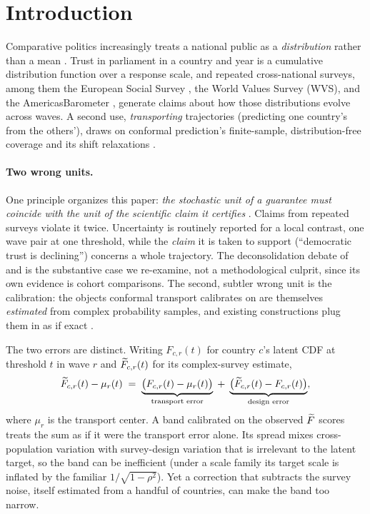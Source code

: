 \section{Introduction}

Comparative politics increasingly treats a national public as a
\emph{distribution} rather than a mean \citep{dimaggio1996americans}. Trust in parliament in a country and
year is a cumulative distribution function over a response scale, and
repeated cross-national surveys, among them the European Social Survey
\citep[ESS;][]{kaminska2017survey}, the World Values Survey (WVS), and the
AmericasBarometer \citep{lapop2021pulse}, generate claims about how those
distributions evolve across waves. A second use, \emph{transporting} trajectories (predicting one country's
from the others'), draws on conformal prediction's finite-sample,
distribution-free coverage \citep{vovk2005algorithmic,lei2018distribution}
and its shift relaxations
\citep{tibshirani2019conformal,gibbs2021adaptive,gibbs2024conditional}.

\paragraph{Two wrong units.} One principle organizes this paper: \emph{the
stochastic unit of a guarantee must coincide with the unit of the scientific
claim it certifies}
\citep{robinson1950ecological,openshaw1984modifiable}. Claims from repeated
surveys violate it twice.
Uncertainty is routinely reported for a local contrast, one wave pair at one
threshold, while the \emph{claim} it is taken to support (``democratic
trust is declining'') concerns a whole trajectory. The deconsolidation debate
of \citet{foa2016democratic,foa2017signs} and \citet{valgardsson2025crisis}
is the substantive case we re-examine, not a methodological culprit, since
its own evidence is cohort comparisons. The
second, subtler wrong unit is the calibration: the objects conformal
transport calibrates on are themselves \emph{estimated} from complex
probability samples, and existing constructions plug them in as if exact \citep{dunn2023distribution,lee2023distribution}.

The two errors are distinct. Writing $F_{c, r}(t)$ for country $c$'s latent CDF at
threshold $t$ in wave $r$ and $\widetilde{F}_{c, r}(t)$ for its complex-survey estimate,
\begin{equation}\label{eq:decomp}
\widetilde{F}_{c, r}(t) - \mu_r(t)
\;=\; \underbrace{\big(F_{c, r}(t)-\mu_r(t)\big)}_{\text{transport error}}
\;+\; \underbrace{\big(\widetilde{F}_{c, r}(t)-F_{c, r}(t)\big)}_{\text{design error}},
\end{equation}
where $\mu_r$ is the transport center. A band calibrated on the observed
$\widetilde{F}$ scores treats the sum as if it were the transport error alone. Its
spread mixes cross-population variation with survey-design variation
that is irrelevant to the latent target, so the band can be inefficient
(under a scale family its target scale is inflated by the familiar
$1/\sqrt{1-\rho^2}$). Yet a correction that subtracts the survey noise,
itself estimated from a handful of countries, can make the band too narrow.

